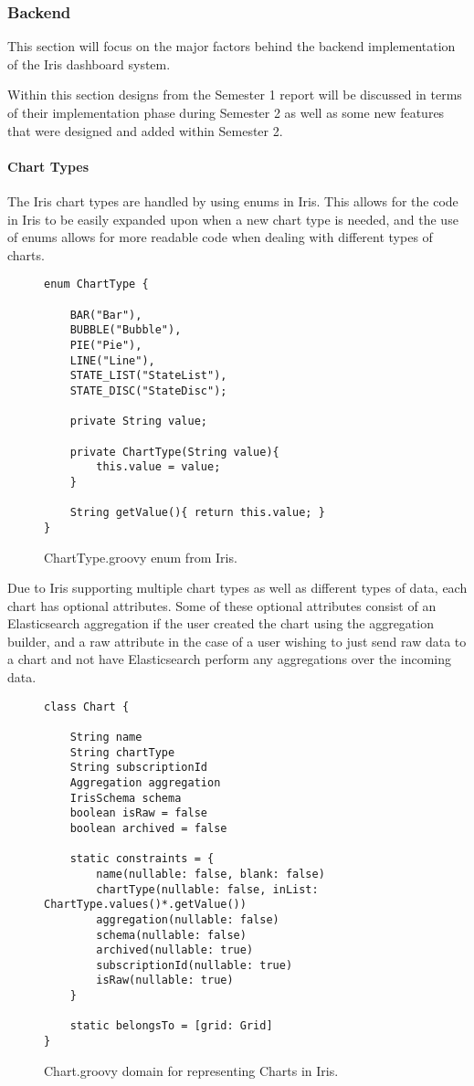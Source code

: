 \documentclass[12pt,a4paper,titlepage]{report}
\begin{document}
\subsubsection{Backend}
This section will focus on the major factors behind the backend implementation of the Iris dashboard system.

Within this section designs from the Semester 1 report will be discussed in terms of their implementation phase during Semester 2 as well as some new features that were designed and added within Semester 2.
\paragraph{Chart Types}
The Iris chart types are handled by using enums in Iris. This allows for the code in Iris to be easily expanded upon when a new chart type is needed, and the use of enums allows for more readable code when dealing with different types of charts.

\begin{figure}[H]
\begin{tcolorbox}
\begin{verbatim}
enum ChartType {

    BAR("Bar"),
    BUBBLE("Bubble"),
    PIE("Pie"),
    LINE("Line"),
    STATE_LIST("StateList"),
    STATE_DISC("StateDisc");

    private String value;

    private ChartType(String value){
        this.value = value;
    }

    String getValue(){ return this.value; }
}
\end{verbatim}
\end{tcolorbox}
\caption{ChartType.groovy enum from Iris.}
\end{figure}
Due to Iris supporting multiple chart types as well as different types of data, each chart has optional attributes. Some of these optional attributes consist of an Elasticsearch aggregation if the user created the chart using the aggregation builder, and a raw attribute in the case of a user wishing to just send raw data to a chart and not have Elasticsearch perform any aggregations over the incoming data.
\begin{figure}[H]
\begin{tcolorbox}
\begin{verbatim}
class Chart {

    String name
    String chartType
    String subscriptionId
    Aggregation aggregation
    IrisSchema schema
    boolean isRaw = false
    boolean archived = false

    static constraints = {
        name(nullable: false, blank: false)
        chartType(nullable: false, inList: ChartType.values()*.getValue())
        aggregation(nullable: false)
        schema(nullable: false)
        archived(nullable: true)
        subscriptionId(nullable: true)
        isRaw(nullable: true)
    }

    static belongsTo = [grid: Grid]
}
\end{verbatim}
\end{tcolorbox}
\caption{Chart.groovy domain for representing Charts in Iris.}
\end{figure}
\end{document}
